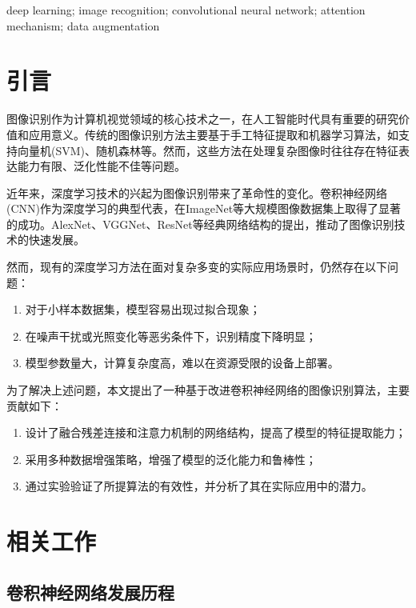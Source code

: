 \documentclass[a4paper,12pt]{article}
\newcommand{\enkeywords}[1]{
    \vspace{1em}
    \noindent{\textbf{\fontsize{9pt}{11pt}\selectfont Keywords: }}
    \fontsize{9pt}{11pt}\selectfont #1
}
\begin{document}
\enkeywords{deep learning; image recognition; convolutional neural network; attention mechanism; data augmentation}

\newpage

\section{引言}

图像识别作为计算机视觉领域的核心技术之一，在人工智能时代具有重要的研究价值和应用意义。传统的图像识别方法主要基于手工特征提取和机器学习算法，如支持向量机(SVM)\cite{cortes1995support}、随机森林\cite{breiman2001random}等。然而，这些方法在处理复杂图像时往往存在特征表达能力有限、泛化性能不佳等问题。

近年来，深度学习技术的兴起为图像识别带来了革命性的变化。卷积神经网络(CNN)作为深度学习的典型代表，在ImageNet\cite{deng2009imagenet}等大规模图像数据集上取得了显著的成功。AlexNet\cite{krizhevsky2012imagenet}、VGGNet\cite{simonyan2014very}、ResNet\cite{he2016deep}等经典网络结构的提出，推动了图像识别技术的快速发展。

然而，现有的深度学习方法在面对复杂多变的实际应用场景时，仍然存在以下问题：
\begin{enumerate}
    \item 对于小样本数据集，模型容易出现过拟合现象；
    \item 在噪声干扰或光照变化等恶劣条件下，识别精度下降明显；
    \item 模型参数量大，计算复杂度高，难以在资源受限的设备上部署。
\end{enumerate}

为了解决上述问题，本文提出了一种基于改进卷积神经网络的图像识别算法，主要贡献如下：
\begin{enumerate}
    \item 设计了融合残差连接和注意力机制的网络结构，提高了模型的特征提取能力；
    \item 采用多种数据增强策略，增强了模型的泛化能力和鲁棒性；
    \item 通过实验验证了所提算法的有效性，并分析了其在实际应用中的潜力。
\end{enumerate}

\section{相关工作}

\subsection{卷积神经网络发展历程}
\end{document}
